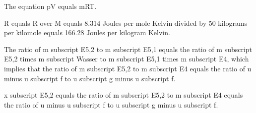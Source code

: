 The equation pV equals mRT.

R equals R over M equals 8.314 Joules per mole Kelvin divided by 50 kilograms per kilomole equals 166.28 Joules per kilogram Kelvin.

The ratio of m subscript E5,2 to m subscript E5,1 equals the ratio of m subscript E5,2 times m subscript Wasser to m subscript E5,1 times m subscript E4, which implies that the ratio of m subscript E5,2 to m subscript E4 equals the ratio of u minus u subscript f to u subscript g minus u subscript f.

x subscript E5,2 equals the ratio of m subscript E5,2 to m subscript E4 equals the ratio of u minus u subscript f to u subscript g minus u subscript f.
